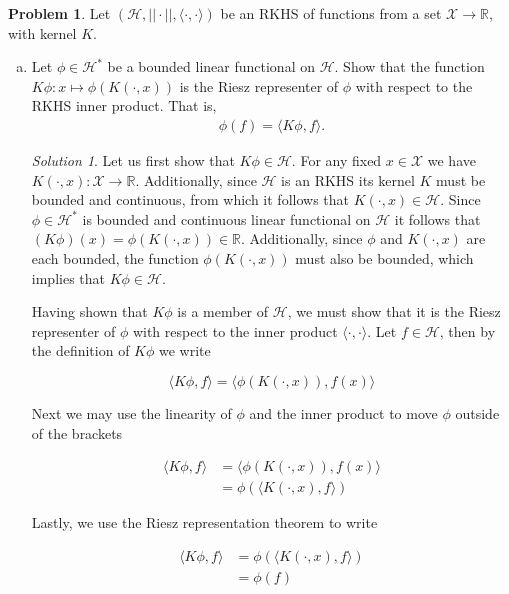 \documentclass[12pt,a4paper]{article}
\theoremstyle{definition}
\newtheorem{problem}{Problem}
\theoremstyle{remark}
\newtheorem*{solution}{Solution}
\begin{document}
\begin{problem}
    Let $(\mathcal H, ||\cdot||, \langle \cdot, \cdot \rangle)$ be an RKHS of functions from a set $\mathcal X \rightarrow \mathbb R$, with kernel $K$. 

\begin{enumerate}[(a)]
    \item Let $\phi \in \mathcal H^*$ be a bounded linear functional on $\mathcal H$. Show that the function $K \phi : x \mapsto \phi(K(\cdot, x))$ is the Riesz representer of $\phi$ with respect to the RKHS inner product. That is, 
    \begin{align}
        \phi(f) = \langle K\phi, f \rangle.
    \end{align}

    \begin{solution}
        Let us first show that $K\phi \in \mathcal H$. For any fixed $x \in \mathcal X$ we have $K(\cdot, x): \mathcal X \rightarrow \mathbb R$. Additionally, since $\mathcal H$ is an RKHS its kernel $K$ must be bounded and continuous, from which it follows that $K(\cdot, x) \in \mathcal H$. Since $\phi \in \mathcal H^*$ is bounded and continuous linear functional on $\mathcal H$ it follows that $(K\phi)(x) = \phi(K(\cdot, x)) \in \mathbb R$. Additionally, since $\phi$ and $K(\cdot, x)$ are each bounded, the function $\phi(K(\cdot, x))$ must also be bounded, which implies that $K\phi \in \mathcal H$. 

        Having shown that $K\phi$ is a member of $\mathcal H$, we must show that it is the Riesz representer of $\phi$ with respect to the inner product $\langle \cdot, \cdot \rangle$. Let $f \in \mathcal H$, then by the definition of $K \phi$ we write 

        $$\langle K\phi, f \rangle = \langle \phi(K(\cdot, x)), f(x) \rangle$$

        Next we may use the linearity of $\phi$ and the inner product to move $\phi$ outside of the brackets

        \begin{align*}
            \langle K\phi, f \rangle &= \langle \phi(K(\cdot, x)), f(x) \rangle \\
            &= \phi\left(\langle K(\cdot, x) , f \rangle \right)
        \end{align*}

        Lastly, we use the Riesz representation theorem to write 

        \begin{align*}
            \langle K\phi, f \rangle &= \phi\left(\langle K(\cdot, x) , f \rangle \right) \\
            &= \phi(f)
        \end{align*}


\end{solution}
\end{enumerate}
\end{problem}
\end{document}
